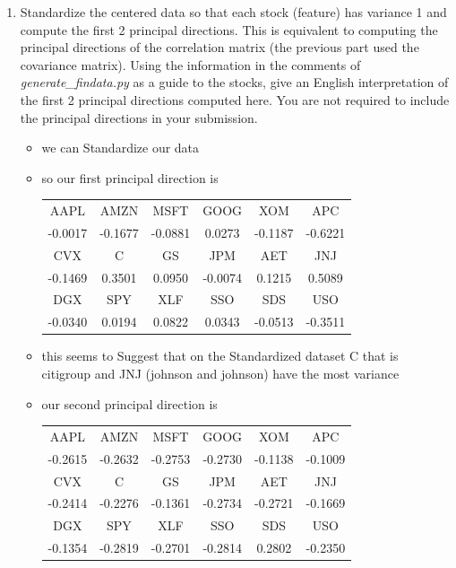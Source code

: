 \documentclass[12pt,twoside]{article}
\begin{document}
\begin{enumerate}
\begin{enumerate}
  \item Standardize the centered data so that each stock (feature) has
    variance 1 and compute the first 2 principal directions.  This is
    equivalent to computing the principal directions of the
    correlation matrix (the previous part used the covariance
    matrix).  Using the information in the comments of
   \emph{generate\_findata.py} as a guide to the stocks, 
    give an English interpretation of the first 2 principal directions
    computed here. 
    You are not required to include the principal directions in
    your submission.
    \begin{itemize}
     \color{blue}
      \item we can Standardize our data 
      \item so our first principal direction is \begin{center}
        \begin{tabular}{c|c|c|c|c|c}
        AAPL & AMZN & MSFT & GOOG & XOM & APC\\
        -0.0017 & -0.1677 & -0.0881 & 0.0273 & -0.1187 & -0.6221\\
        \hline
        CVX & C & GS & JPM & AET & JNJ\\
        -0.1469 & 0.3501 & 0.0950 & -0.0074 & 0.1215 & 0.5089\\
        \hline
        DGX & SPY & XLF & SSO & SDS & USO\\
        -0.0340 & 0.0194 & 0.0822 & 0.0343 & -0.0513 & -0.3511\\
        \end{tabular}
        \end{center}
        \item this seems to Suggest that on the Standardized dataset C that is citigroup and JNJ (johnson and johnson) have the most variance 
      \item our second principal direction is \begin{center}
        \begin{tabular}{c|c|c|c|c|c}
        AAPL & AMZN & MSFT & GOOG & XOM & APC\\
        -0.2615 & -0.2632 & -0.2753 & -0.2730 & -0.1138 & -0.1009\\
        \hline
        CVX & C & GS & JPM & AET & JNJ\\
        -0.2414 & -0.2276 & -0.1361 & -0.2734 & -0.2721 & -0.1669\\
        \hline
        DGX & SPY & XLF & SSO & SDS & USO\\
        -0.1354 & -0.2819 & -0.2701 & -0.2814 & 0.2802 & -0.2350\\

\end{tabular}
\end{center}
\end{itemize}
\end{enumerate}
\end{enumerate}
\end{document}
